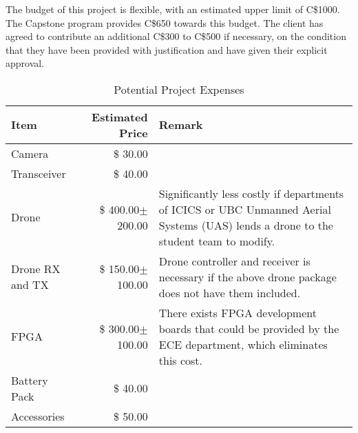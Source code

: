 The budget of this project is flexible, with an estimated upper limit of C\$1000. 
The Capstone program provides C\$650 towards this budget.
The client has agreed to contribute an additional C\$300 to C\$500 if necessary, on the condition that they have been provided with justification and have given their explicit approval.

\begin{table}[H]
    \centering
    \caption{Potential Project Expenses}
    \label{table:budget-items}

    \begin{tabular}{lrp{9cm}}

    \hline
    \textbf{Item} & \textbf{Estimated Price} & \textbf{Remark}\\
    \hline
    Camera&\$ \hfill30.00&\\
    Transceiver&\$ \hfill40.00&\\
    Drone&\$ \hfill400.00$\pm$200.00& Significantly less costly if departments of ICICS or UBC Unmanned Aerial Systems (UAS) lends a drone to the student team to modify.\\
    Drone RX and TX & \$ \hfill 150.00$\pm$100.00 & Drone controller and receiver is necessary if the above drone package does not have them included.\\
    FPGA&\$ \hfill 300.00$\pm$100.00& There exists FPGA development boards that could be provided by the ECE department, which eliminates this cost.\\
    Battery Pack&\$ \hfill40.00&\\
    Accessories&\$ \hfill50.00&\\
    \hline

    \end{tabular} 
\end{table}

